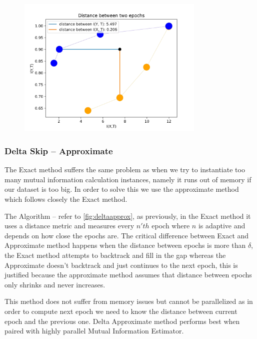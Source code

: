\documentclass[dissertation.tex]{subfiles}
\begin{document}
  \begin{figure}[H]
    \centering
    \includegraphics[width=0.80\textwidth]{figs/ip_pair.jpg}
    \label{fig:ip_pair}
  \end{figure}

\subsubsection{Delta Skip -- Approximate}

  The Exact method suffers the same problem as when we try to instantiate too
  many mutual information calculation instances, namely it runs out of memory if
  our dataset is too big. In order to solve this we use the approximate method
  which follows closely the Exact method. 

  The Algorithm -- refer to \autoref{fig:deltaapprox}, as previously, in the
  Exact method it uses a distance metric and measures every $n'th$ epoch where
  $n$ is adaptive and depends on how close the epochs are. The critical
  difference between Exact and Approximate method happens when the distance
  between epochs is more than $\delta$, the Exact method attempts to backtrack
  and fill in the gap whereas the Approximate doesn't backtrack and just
  continues to the next epoch, this is justified because the approximate method
  assumes that distance between epochs only shrinks and never increases.

  This method does not suffer from memory issues but cannot be parallelized as
  in order to compute next epoch we need to know the distance between current
  epoch and the previous one. Delta Approximate method performs best when paired
  with highly parallel Mutual Information Estimator.
\end{document}
